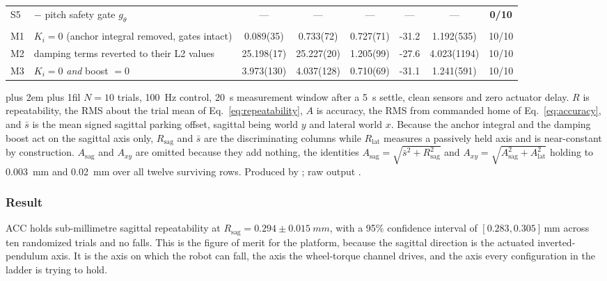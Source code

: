 \documentclass[a4paper,fleqn]{cas-dc}
\newcommand{\tabnote}{\par\leftskip=0pt\rightskip=0pt plus 2em%
  \parfillskip=0pt plus 1fil\relax}
\begin{document}
\begin{table}[pos=!tp]
\begin{tabular}{@{}ll S[table-format=2.3(4)] S[table-format=2.3(3)] S[table-format=2.3(4)] S[table-format=-2.1] S[table-format=2.3(4)] c@{}}
S5 & $-$ pitch safety gate $g_\theta$ & {---} & {---} & {---} & {---} & {---} & \textbf{0/10} \\
\addlinespace
{}\\
M1 & $K_i{=}0$ (anchor integral removed, gates intact) & 0.089(35) & 0.733(72) & 0.727(71) & -31.2 & 1.192(535) & 10/10 \\
M2 & damping terms reverted to their L2 values & 25.198(17) & 25.227(20) & 1.205(99) & -27.6 & 4.023(1194) & 10/10 \\
M3 & $K_i{=}0$ \emph{and} boost $=0$ & 3.973(130) & 4.037(128) & 0.710(69) & -31.1 & 1.241(591) & 10/10 \\
\bottomrule
\end{tabular}
\vspace{2pt}\tabnote\noindent
$N{=}10$ trials, \SI{100}{Hz} control, \SI{20}{s} measurement window after a
\SI{5}{s} settle, clean sensors and zero actuator delay. $R$ is repeatability,
the RMS about the trial mean of Eq.~\eqref{eq:repeatability}, $A$ is accuracy,
the RMS from commanded home of Eq.~\eqref{eq:accuracy}, and $\bar{s}$ is the mean
signed sagittal parking offset, sagittal being world $y$ and lateral world $x$.
Because the anchor integral and the damping boost act on the sagittal axis only,
$R_{\text{sag}}$ and $\bar{s}$ are the discriminating columns while
$R_{\text{lat}}$ measures a passively held axis and is near-constant by
construction. $A_{\text{sag}}$ and $A_{xy}$ are omitted because they add nothing,
the identities $A_{\text{sag}}=\sqrt{\bar{s}^{2}+R_{\text{sag}}^{2}}$ and
$A_{xy}=\sqrt{A_{\text{sag}}^{2}+A_{\text{lat}}^{2}}$ holding to \SI{0.003}{mm}
and \SI{0.02}{mm} over all twelve surviving rows. Produced by
; raw output
.
\end{table}

\subsubsection{Result}

ACC holds sub-millimetre sagittal repeatability at
$R_{\text{sag}} = 0.294{\pm}\SI{0.015}{mm}$, with a 95\% confidence interval of
$[0.283,0.305]$\,mm across ten randomized trials and no falls. This is the
figure of merit for the platform, because the sagittal direction is the actuated
inverted-pendulum axis. It is the axis on which the robot can fall, the axis the
wheel-torque channel drives, and the axis every configuration in the ladder is
trying to hold.
\end{document}
